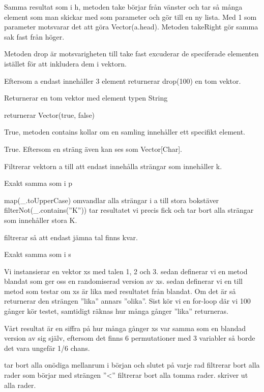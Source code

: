 \Subtask 
Samma resultat som i h, metoden take börjar från vänster och tar så många element som man skickar med som parameter och gör till en ny lista. Med 1 som parameter motsvarar det att göra Vector(a.head). Metoden takeRight gör samma sak fast från höger.

\Subtask 
Metoden drop är motsvarigheten till take fast excuderar de speciferade elementen istället för att inkludera dem i vektorn.

\Subtask 
Eftersom a endast innehåller 3 element returnerar drop(100) en tom vektor.

\Subtask 
Returnerar en tom vektor med element typen String

\Subtask 
returnerar Vector(true, false) 

\Subtask 
True, metoden contains kollar om en samling innehåller ett specifikt element.

\Subtask 
True. Eftersom en sträng även kan ses som Vector[Char].

\Subtask 
Filtrerar vektorn a till att endast innehålla strängar som innehåller k.

\Subtask 
Exakt samma som i p

\Subtask 
map(\_.toUpperCase) omvandlar alla strängar i a till stora bokstäver
filterNot(\_.contains(''K'')) tar resultatet vi precis fick och tar bort alla strängar som innehåller stora K.

\Subtask 
filtrerar så att endast jämna tal finns kvar.

\Subtask 
Exakt samma som i s



\Task %

\Subtask 
Vi instansierar en vektor xs med talen 1, 2 och 3.
sedan definerar vi en metod blandat som ger oss en randomiserad version av xs.
sedan definerar vi en till metod som testar om xs är lika med resultatet från blandat. Om det är så returnerar den strängen ''lika'' annars ''olika''.
Sist kör vi en for-loop där vi 100 gånger kör testet, samtidigt räknas hur många gånger ''lika'' returneras.

Vårt resultat är en siffra på hur många gånger xs var samma som en blandad version av sig själv, eftersom det finns 6 permutationer med 3 variabler så borde det vara ungefär 1/6 chans.

\Subtask 
{} tar bort alla onödiga mellanrum i början och slutet på varje rad
 filtrerar bort alla rader som börjar med strängen ''<''
 filtrerar bort alla tomma rader.
 skriver ut alla rader.

